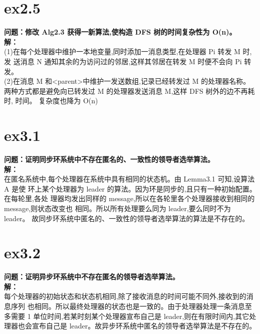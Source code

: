 \documentclass[10pt, a4paper]{article}
\begin{document}
\section{ex2.5}
\textbf{问题：修改 Alg2.3 获得一新算法,使构造 DFS 树的时间复杂性为 O(n)。}\\
\textbf{解：}\\
(1)在每个处理器中维护一本地变量,同时添加一消息类型,在处理器 Pi 转发 M 时,发
送消息 N 通知其余的为访问过的邻居,这样其邻居在转发 M 时便不会向 Pi 转发。\\
(2)在消息 M 和<parent>中维护一发送数组,记录已经转发过 M 的处理器名称。
两种方式都是避免向已转发过 M 的处理器发送消息 M,这样 DFS 树外的边不再耗时,
时间。
复杂度也降为 O(n)

\section{ex3.1}
\textbf{问题：证明同步环系统中不存在匿名的、一致性的领导者选举算法。}\\
\textbf{解：}\\
在匿名系统中,每个处理器在系统中具有相同的状态机。由 Lemma3.1 可知,设算法 A 是使
环上某个处理器为 leader 的算法。因为环是同步的,且只有一种初始配置。在每轮里,各处
理器均发出同样的 message,所以在各轮里各个处理器接收到相同的 message,则状态改变也
相同。所以所有处理要么同为 leader,要么同时不为 leader。
故同步环系统中匿名的、一致性的领导者选举算法的算法是不存在的。
\section{ex3.2}
\textbf{问题：证明异步环系统中不存在匿名的领导者选举算法。}\\
\textbf{解：}\\
每个处理器的初始状态和状态机相同,除了接收消息的时间可能不同外,接收到的消息序列
也相同。所以最终处理器的状态也是一致的。由于处理器处理一条消息至多需要 1 单位时间,若某时刻某个处理器宣布自己是 leader,则在有限时间内,其它处理器也会宣布自己是 leader。故异步环系统中匿名的领导者选举算法是不存在的。
\end{document}
